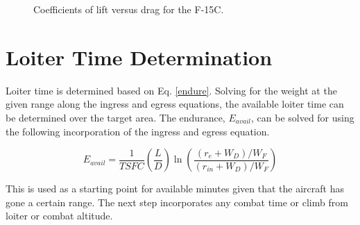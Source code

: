 \begin{figure}%
    \centering
    \qquad
    \caption{Coefficients of lift versus drag for the F-15C.}%
    \label{fig:machSpeedByGroup}%
\end{figure}
\section{Loiter Time Determination}
Loiter time is determined based on Eq. \ref{endure}. Solving for the weight at the given range along the ingress and egress equations, the available loiter time can be determined over the target area. The endurance, $E_{avail}$, can be solved for using the following incorporation of the ingress and egress equation.

\begin{equation}
    E_{avail} = \dfrac{1}{TSFC}\left(\dfrac{L}{D}\right)\ln\left(\dfrac{(r_e+ W_D)/W_F}{(r_{in}+W_D)/W_F}\right)
\end{equation}

This is used as a starting point for available minutes given that the aircraft has gone a certain range. The next step incorporates any combat time or climb from loiter or combat altitude. 

